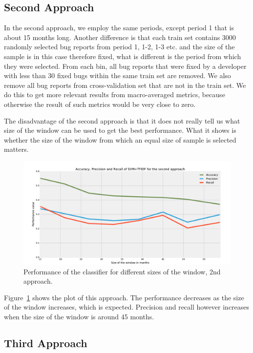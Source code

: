 \subsection{Second Approach}

In the second approach, we employ the same periods, except period 1 that is about 15 months long. Another difference is that each train set contains 3000 randomly selected bug reports from period 1, 1-2, 1-3 etc. and the size of the sample is in this case therefore fixed, what is different is the period from which they were selected. From each bin, all bug reports that were fixed by a developer with less than 30 fixed bugs within the same train set are removed. We also remove all bug reports from cross-validation set that are not in the train set. We do this to get more relevant results from macro-averaged metrics, because otherwise the result of such metrics would be very close to zero.

The disadvantage of the second approach is that it does not really tell us what size of the window can be used to get the best performance. What it shows is whether the size of the window from which an equal size of sample is selected matters.

\begin{figure}[htbp]
    \centering
        \includegraphics[width=\textwidth]{./images/window_size/firefox_2a.pdf}
    \caption{Performance of the classifier for different sizes of the window, 2nd approach.}
    \label{fig:window.firefox.2a}
\end{figure}

Figure~\ref{fig:window.firefox.2a} shows the plot of this approach. The performance decreases as the size of the window increases, which is expected. Precision and recall however increases when the size of the window is around 45 months.

\subsection{Third Approach}

